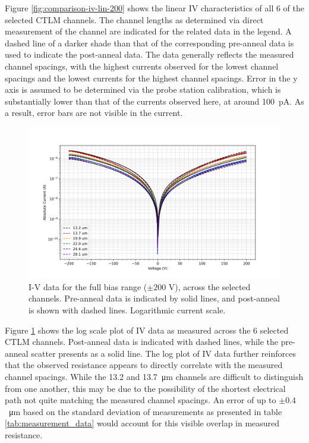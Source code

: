 \begin{refsection}
Figure \ref{fig:comparison-iv-lin-200} shows the linear IV characteristics of all 6 of the selected CTLM channels. The channel lengths as determined via direct measurement of the channel are indicated for the related data in the legend. A dashed line of a darker shade than that of the corresponding pre-anneal data is used to indicate the post-anneal data. The data generally reflects the measured channel spacings, with the highest currents observed for the lowest channel spacings and the lowest currents for the highest channel spacings. Error in the y axis is assumed to be determined via the probe station calibration, which is substantially lower than that of the currents observed here, at around 100~\si{\pico\ampere}. As a result, error bars are not visible in the current.

\begin{figure}[H]
    \centering
    \includegraphics[width=\textwidth]{Chapter3/Figs/Raster/Sample F 2022/Comparison/log_scale.png}
    \caption{I-V data for the full bias range ($\pm200$ \si{\volt}), across the selected channels. Pre-anneal data is indicated by solid lines, and post-anneal is shown with dashed lines. Logarithmic current scale.}
    \label{fig:comparison-iv-log-200}
\end{figure}

Figure \ref{fig:comparison-iv-log-200} shows the log scale plot of IV data as measured across the 6 selected CTLM channels. Post-anneal data is indicated with dashed lines, while the pre-anneal scatter presents as a solid line. The log plot of IV data further reinforces that the observed resistance appears to directly correlate with the measured channel spacings. While the 13.2 and 13.7~\si{\micro\metre} channels are difficult to distinguish from one another, this may be due to the possibility of the shortest electrical path not quite matching the measured channel spacings. An error of up to $\pm0.4$~\si{\micro\metre} based on the standard deviation of measurements as presented in table \ref{tab:measurement_data} would account for this visible overlap in measured resistance.


\end{refsection}
